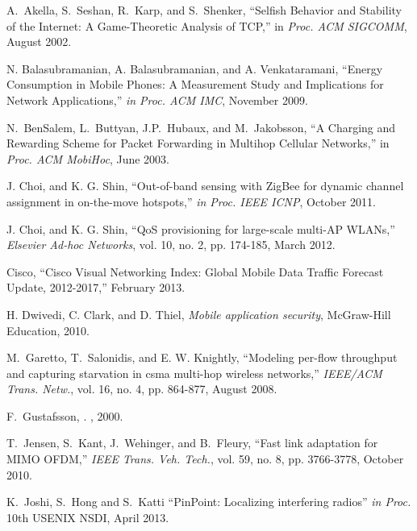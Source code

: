 \documentclass[10pt,journal,cspaper,compsoc]{IEEEtran}
\begin{document}
%

\begin{thebibliography}{1}

A.~Akella, S.~Seshan, R.~Karp, and S.~Shenker,
``Selfish Behavior and Stability of the Internet: A Game-Theoretic Analysis of TCP,''
in {\em Proc. ACM SIGCOMM}, August 2002.

N. Balasubramanian, A. Balasubramanian, and A. Venkataramani,
``Energy Consumption in Mobile Phones: A Measurement
Study and Implications for Network Applications,''
{\em in Proc. ACM IMC}, November 2009.

N.~BenSalem, L.~Buttyan, J.P.~Hubaux, and M.~Jakobsson,
``A Charging and Rewarding Scheme for Packet Forwarding in Multihop Cellular Networks,''
in {\em Proc. ACM MobiHoc}, June 2003.

J. Choi, and K. G. Shin,
``Out-of-band sensing with ZigBee for dynamic channel assignment
in on-the-move hotspots,''
{\em in Proc. IEEE ICNP}, October 2011.

J. Choi, and K. G. Shin,
``QoS provisioning for large-scale multi-AP WLANs,''
{\em Elsevier Ad-hoc Networks}, vol. 10, no. 2, pp. 174-185, March 2012.

Cisco, ``{Cisco Visual Networking Index: Global Mobile Data Traffic Forecast
  Update, 2012-2017},'' February 2013.

H. Dwivedi, C. Clark, and D. Thiel,
{\em Mobile application security}, McGraw-Hill Education, 2010.



M.~Garetto, T.~Salonidis, and E. W. Knightly,
``Modeling per-flow throughput and capturing starvation in csma multi-hop wireless networks,''
{\em IEEE/ACM Trans. Netw.}, vol. 16, no. 4, pp. 864-877, August 2008.

F.~Gustafsson,
.
, 2000.



T.~Jensen, S.~Kant, J.~Wehinger, and B.~Fleury,
``Fast link adaptation for MIMO OFDM,''
{\em IEEE Trans. Veh. Tech.}, vol. 59, no. 8, pp. 3766-3778, October 2010.

K.~Joshi, S.~Hong and S.~Katti
``PinPoint: Localizing interfering radios''
{\em in Proc.} 10th USENIX NSDI, April 2013.


\end{thebibliography}
\end{document}
